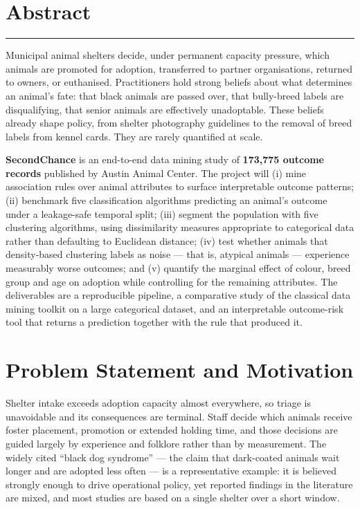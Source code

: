\documentclass[11pt,a4paper]{article}
\begin{document}
\section*{Abstract}
\rule{\textwidth}{0.6pt}\vspace{4pt}

Municipal animal shelters decide, under permanent capacity pressure, which animals
are promoted for adoption, transferred to partner organisations, returned to owners,
or euthanised. Practitioners hold strong beliefs about what determines an animal's
fate: that black animals are passed over, that bully-breed labels are disqualifying,
that senior animals are effectively unadoptable. These beliefs already shape policy,
from shelter photography guidelines to the removal of breed labels from kennel cards.
They are rarely quantified at scale.

\textbf{SecondChance} is an end-to-end data mining study of \textbf{173{,}775 outcome
records} published by Austin Animal Center. The project will (i) mine association
rules over animal attributes to surface interpretable outcome patterns; (ii) benchmark
five classification algorithms predicting an animal's outcome under a leakage-safe
temporal split; (iii) segment the population with five clustering algorithms, using
dissimilarity measures appropriate to categorical data rather than defaulting to
Euclidean distance; (iv) test whether animals that density-based clustering labels as
noise --- that is, atypical animals --- experience measurably worse outcomes; and
(v) quantify the marginal effect of colour, breed group and age on adoption while
controlling for the remaining attributes. The deliverables are a reproducible pipeline,
a comparative study of the classical data mining toolkit on a large categorical
dataset, and an interpretable outcome-risk tool that returns a prediction together
with the rule that produced it.

\section*{Problem Statement and Motivation}

Shelter intake exceeds adoption capacity almost everywhere, so triage is unavoidable
and its consequences are terminal. Staff decide which animals receive foster
placement, promotion or extended holding time, and those decisions are guided largely
by experience and folklore rather than by measurement. The widely cited ``black dog
syndrome'' --- the claim that dark-coated animals wait longer and are adopted less
often --- is a representative example: it is believed strongly enough to drive
operational policy, yet reported findings in the literature are mixed, and most studies
are based on a single shelter over a short window.
\end{document}
